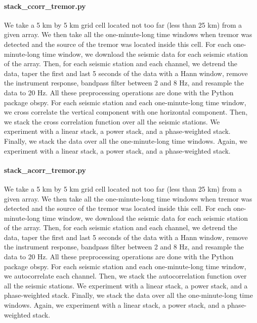 \documentclass[workdone.tex]{subfiles}
\begin{document}
\paragraph{stack\_ccorr\_tremor.py} We take a 5 km by 5 km grid cell located not too far (less than 25 km) from a given array. We then take all the one-minute-long time windows when tremor was detected and the source of the tremor was located inside this cell. For each one-minute-long time window, we download the seismic data for each seismic station of the array. Then, for each seismic station and each channel, we detrend the data, taper the first and last 5 seconds of the data with a Hann window, remove the instrument response, bandpass filter between 2 and 8 Hz, and resample the data to 20 Hz. All these preprocessing operations are done with the Python package obspy. For each seismic station and each one-minute-long time window, we cross correlate the vertical component with one horizontal component. Then, we stack the cross correlation function over all the seismic stations. We experiment with a linear stack, a power stack, and a phase-weighted stack. Finally, we stack the data over all the one-minute-long time windows. Again, we experiment with a linear stack, a power stack, and a phase-weighted stack.

\paragraph{stack\_acorr\_tremor.py} We take a 5 km by 5 km grid cell located not too far (less than 25 km) from a given array. We then take all the one-minute-long time windows when tremor was detected and the source of the tremor was located inside this cell. For each one-minute-long time window, we download the seismic data for each seismic station of the array. Then, for each seismic station and each channel, we detrend the data, taper the first and last 5 seconds of the data with a Hann window, remove the instrument response, bandpass filter between 2 and 8 Hz, and resample the data to 20 Hz. All these preprocessing operations are done with the Python package obspy. For each seismic station and each one-minute-long time window, we autocorrelate each channel. Then, we stack the autocorrelation function over all the seismic stations. We experiment with a linear stack, a power stack, and a phase-weighted stack. Finally, we stack the data over all the one-minute-long time windows. Again, we experiment with a linear stack, a power stack, and a phase-weighted stack.
\end{document}
